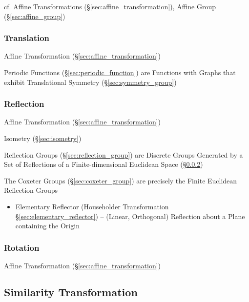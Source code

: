 cf. Affine Transformations (\S\ref{sec:affine_transformation}), Affine Group
(\S\ref{sec:affine_group})



\subsubsection{Translation}\label{sec:translation}

Affine Transformation (\S\ref{sec:affine_transformation})

\fist Periodic Functions (\S\ref{sec:periodic_function}) are Functions with
Graphs that exhibit Translational Symmetry (\S\ref{sec:symmetry_group})



\subsubsection{Reflection}\label{sec:reflection}

Affine Transformation (\S\ref{sec:affine_transformation})

Isometry (\S\ref{sec:isometry})

Reflection Groups (\S\ref{sec:reflection_group}) are Discrete Groups Generated
by a Set of Reflections of a Finite-dimensional Euclidean Space
(\S\ref{sec:reflection})

The Coxeter Groups (\S\ref{sec:coxeter_group}) are precisely the Finite
Euclidean Reflection Groups

\begin{itemize}
  \item Elementary Reflector (Householder Transformation
    \S\ref{sec:elementary_reflector}) -- (Linear, Orthogonal) Reflection about
    a Plane containing the Origin
\end{itemize}



\subsubsection{Rotation}\label{sec:rotation}

Affine Transformation (\S\ref{sec:affine_transformation})



\subsection{Similarity Transformation}\label{sec:similarity_transformation}

